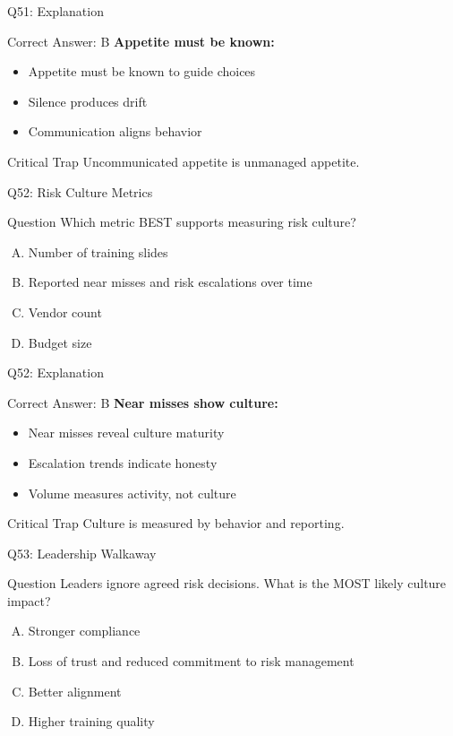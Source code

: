 \documentclass{beamer}
\begin{document}
	\begin{frame}{Q51: Explanation}
		\begin{block}{Correct Answer: B}
			\textbf{Appetite must be known:}
			\begin{itemize}
				\item Appetite must be known to guide choices
				\item Silence produces drift
				\item Communication aligns behavior
			\end{itemize}
		\end{block}
		\begin{alertblock}{Critical Trap}
			Uncommunicated appetite is unmanaged appetite.
		\end{alertblock}
	\end{frame}
	
	\begin{frame}{Q52: Risk Culture Metrics}
		\begin{block}{Question}
			Which metric BEST supports measuring risk culture?
		\end{block}
		\begin{enumerate}[(A)]
			\item Number of training slides
			\item Reported near misses and risk escalations over time
			\item Vendor count
			\item Budget size
		\end{enumerate}
	\end{frame}
	
	\begin{frame}{Q52: Explanation}
		\begin{block}{Correct Answer: B}
			\textbf{Near misses show culture:}
			\begin{itemize}
				\item Near misses reveal culture maturity
				\item Escalation trends indicate honesty
				\item Volume measures activity, not culture
			\end{itemize}
		\end{block}
		\begin{alertblock}{Critical Trap}
			Culture is measured by behavior and reporting.
		\end{alertblock}
	\end{frame}
	
	\begin{frame}{Q53: Leadership Walkaway}
		\begin{block}{Question}
			Leaders ignore agreed risk decisions. What is the MOST likely culture impact?
		\end{block}
		\begin{enumerate}[(A)]
			\item Stronger compliance
			\item Loss of trust and reduced commitment to risk management
			\item Better alignment
			\item Higher training quality
		\end{enumerate}
	\end{frame}
	
\end{document}
